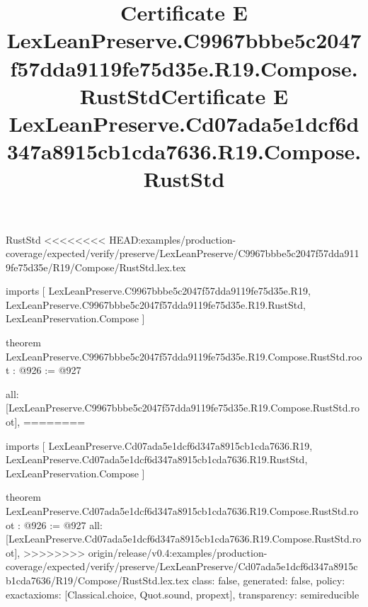 \begin{lexlean}{RustStd}
<<<<<<<< HEAD:examples/production-coverage/expected/verify/preserve/LexLeanPreserve/C9967bbbe5c2047f57dda9119fe75d35e/R19/Compose/RustStd.lex.tex
\title{Certificate E LexLeanPreserve.C9967bbbe5c2047f57dda9119fe75d35e.R19.Compose.RustStd}
\begin{coremodule}
imports [
  LexLeanPreserve.C9967bbbe5c2047f57dda9119fe75d35e.R19,
  LexLeanPreserve.C9967bbbe5c2047f57dda9119fe75d35e.R19.RustStd,
  LexLeanPreservation.Compose
]

theorem LexLeanPreserve.C9967bbbe5c2047f57dda9119fe75d35e.R19.Compose.RustStd.root : @926 := @927 {
  all: [LexLeanPreserve.C9967bbbe5c2047f57dda9119fe75d35e.R19.Compose.RustStd.root],
========
\title{Certificate E LexLeanPreserve.Cd07ada5e1dcf6d347a8915cb1cda7636.R19.Compose.RustStd}
\begin{coremodule}
imports [
  LexLeanPreserve.Cd07ada5e1dcf6d347a8915cb1cda7636.R19,
  LexLeanPreserve.Cd07ada5e1dcf6d347a8915cb1cda7636.R19.RustStd,
  LexLeanPreservation.Compose
]

theorem LexLeanPreserve.Cd07ada5e1dcf6d347a8915cb1cda7636.R19.Compose.RustStd.root : @926 := @927 {
  all: [LexLeanPreserve.Cd07ada5e1dcf6d347a8915cb1cda7636.R19.Compose.RustStd.root],
>>>>>>>> origin/release/v0.4:examples/production-coverage/expected/verify/preserve/LexLeanPreserve/Cd07ada5e1dcf6d347a8915cb1cda7636/R19/Compose/RustStd.lex.tex
  class: false,
  generated: false,
  policy: exact{axioms: [Classical.choice, Quot.sound, propext]},
  transparency: semireducible
}


\end{coremodule}}
\end{coremodule}
\end{lexlean}
